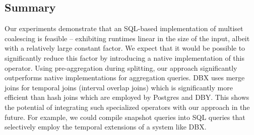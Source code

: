 

\subsection{Summary}
\label{sec:summary}

Our experiments demonstrate that an SQL-based implementation of multiset coalescing is feasible -- exhibiting runtimes linear in the size of the input, albeit with a relatively large constant factor. We expect that it would be possible to significantly reduce this factor by introducing a native implementation of this operator. Using pre-aggregation during splitting, our approach significantly outperforms native implementations for aggregation queries. %
DBX uses merge joins for temporal joins (interval overlap joins) which is significantly more efficient than hash joins which are employed by Postgres and DBY. %
This shows the potential of integrating %
such specialized operators with our approach in the future. For example, we could compile snapshot queries into SQL queries that selectively employ the temporal extensions of a system like DBX.


